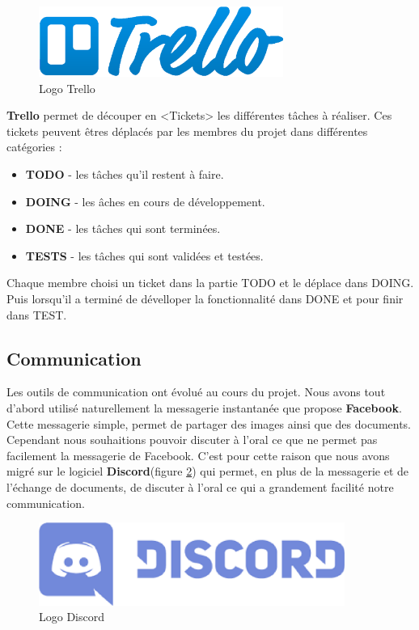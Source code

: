 \begin{figure}[H]
\centering
\includegraphics[width=8cm]{images/activite/trelloLogo.eps}
\caption{Logo Trello}
\label{trello_logo}
\end{figure}

\textbf{Trello} permet de découper en <Tickets> les différentes t\^aches à réaliser. Ces tickets peuvent \^etres déplacés par les membres du projet dans différentes catégories :

\begin{itemize}
\item \textbf{TODO} - les t\^aches qu'il restent à faire. 
\item \textbf{DOING} - les \^aches en cours de développement.
\item \textbf{DONE} - les t\^aches qui sont terminées.
\item \textbf{TESTS} - les t\^aches qui sont validées et testées.\\
\end{itemize}

Chaque membre choisi un ticket dans la partie TODO et le déplace dans DOING. Puis lorsqu'il a terminé de dévelloper la fonctionnalité dans DONE et pour finir dans TEST.



\subsection{Communication}
Les outils de communication ont évolué au cours du projet. Nous avons tout d'abord utilisé naturellement la messagerie instantanée que propose \textbf{Facebook}. Cette messagerie simple, permet de partager des images ainsi que des documents.
Cependant nous souhaitions pouvoir discuter à l'oral ce que ne permet pas facilement la messagerie de Facebook. C'est pour cette raison que nous avons migré sur le logiciel \textbf{Discord}(figure \ref{discord_logo}) qui permet, en plus de la messagerie et de l'échange de documents, de discuter à l'oral ce qui a grandement facilité notre communication.

\begin{figure}[!h]
\centering
\includegraphics[width=10cm]{./images/activite/discordLogo.eps}
\caption{Logo Discord}
\label{discord_logo}
\end{figure}

